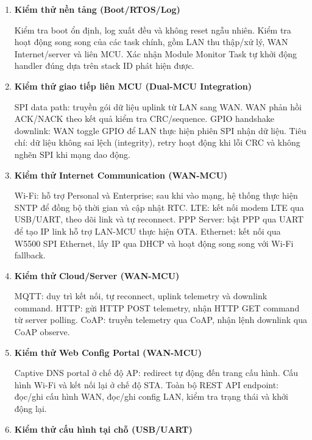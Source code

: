         \begin{enumerate}
            \renewcommand{\labelenumi}{\alph{enumi}.}

            \item \textbf{Kiểm thử nền tảng (Boot/RTOS/Log)}

            Kiểm tra boot ổn định, log xuất đều và không reset ngẫu nhiên. Kiểm tra hoạt động song song của các task chính, gồm LAN thu thập/xử lý, WAN Internet/server và liên MCU. Xác nhận Module Monitor Task tự khởi động handler đúng dựa trên stack ID phát hiện được.

            \item \textbf{Kiểm thử giao tiếp liên MCU (Dual-MCU Integration)}

            SPI data path: truyền gói dữ liệu uplink từ LAN sang WAN. WAN phản hồi ACK/NACK theo kết quả kiểm tra CRC/sequence. GPIO handshake downlink: WAN toggle GPIO để LAN thực hiện phiên SPI nhận dữ liệu. Tiêu chí: dữ liệu không sai lệch (integrity), retry hoạt động khi lỗi CRC và không nghẽn SPI khi mạng dao động.

            \item \textbf{Kiểm thử Internet Communication (WAN-MCU)}

            Wi-Fi: hỗ trợ Personal và Enterprise; sau khi vào mạng, hệ thống thực hiện SNTP để đồng bộ thời gian và cập nhật RTC. LTE: kết nối modem LTE qua USB/UART, theo dõi link và tự reconnect. PPP Server: bật PPP qua UART để tạo IP link hỗ trợ LAN-MCU thực hiện OTA. Ethernet: kết nối qua W5500 SPI Ethernet, lấy IP qua DHCP và hoạt động song song với Wi-Fi fallback.

            \item \textbf{Kiểm thử Cloud/Server (WAN-MCU)}

            MQTT: duy trì kết nối, tự reconnect, uplink telemetry và downlink command. HTTP: gửi HTTP POST telemetry, nhận HTTP GET command từ server polling. CoAP: truyền telemetry qua CoAP, nhận lệnh downlink qua CoAP observe.

            \item \textbf{Kiểm thử Web Config Portal (WAN-MCU)}

            Captive DNS portal ở chế độ AP: redirect tự động đến trang cấu hình. Cấu hình Wi-Fi và kết nối lại ở chế độ STA. Toàn bộ REST API endpoint: đọc/ghi cấu hình WAN, đọc/ghi config LAN, kiểm tra trạng thái và khởi động lại.

            \item \textbf{Kiểm thử cấu hình tại chỗ (USB/UART)}


\end{enumerate}

